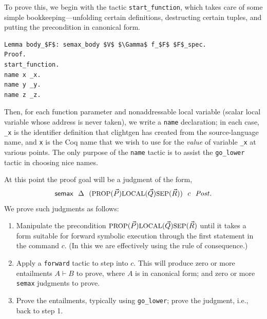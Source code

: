 \documentclass[12pt,fleqn,openany,oneside,showtrims]{memoir}
\begin{document}
To prove this, we begin with the tactic \lstinline{start_function},
which takes care of some simple bookkeeping---unfolding certain
definitions, destructing certain tuples, and putting the precondition
in canonical form.

\begin{lstlisting}
Lemma body_$F$: semax_body $V$ $\Gamma$ f_$F$ $F$_spec.
Proof.
start_function.
name x _x.
name y _y.
name z _z.
\end{lstlisting}

Then, for each function parameter and nonaddressable local variable
(scalar local variable whose address is never taken), we write a
\lstinline{name} declaration; in each case, \lstinline{_x} is the
identifier definition that clightgen has created from the source-language
name, and \lstinline{x} is the Coq name that we wish to use for
the \emph{value} of variable \lstinline{_x} at various points.
The only purpose of the \lstinline{name}
tactic is to assist the \lstinline{go_lower} tactic in choosing nice names.

At this point the proof goal will be a judgment of the form,
\[
\mathsf{semax}~~\Delta~~(\mbox{\small PROP}(\vec{P}) \mbox{\small LOCAL}(\vec{Q}) \mbox{\small SEP}(\vec{R}))~~c~~\mathit{Post}.
\]
We prove such judgments as follows:
\begin{enumerate}
\item Manipulate the precondition
$\mbox{\small PROP}(\vec{P}) \mbox{\small LOCAL}(\vec{Q}) \mbox{\small SEP}(\vec{R})$
until it takes a form suitable for forward symbolic execution
through the first statement in the command $c$.  (In this we are
effectively using the rule of consequence.)
\item Apply a \lstinline{forward} tactic to step into $c$.
This will produce zero or more entailments $A\vdash B$ to prove,
where $A$ is in canonical form;
and zero or more
\lstinline{semax} judgments to prove.
\item Prove the entailments, typically using \lstinline{go_lower};
prove the judgment, i.e., back to step 1.
\end{enumerate}
\end{document}
